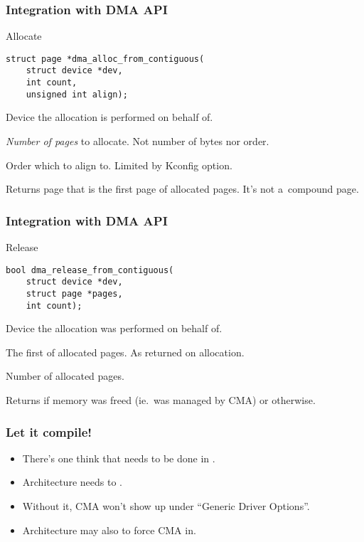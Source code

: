 \begin{frame}[fragile]
  \frametitle{Integration with DMA API}

  \begin{block}{Allocate}
\begin{lstlisting}
struct page *dma_alloc_from_contiguous(
    struct device *dev,
    int count,
    unsigned int align);
\end{lstlisting}
  \end{block}

  \begin{description}[countAA]
  \item[{\ttfamily dev}] Device the allocation is performed on behalf
    of.
  \item[{\ttfamily count}] \emph{Number of pages} to
    allocate. {\footnotesize Not number of bytes nor order.}
  \item[{\ttfamily align}] Order which to align to.  Limited by
    Kconfig option.
  \item Returns page that is the first page of  allocated
    pages. {\footnotesize It's not a~compound page.}
  \end{description}
\end{frame}

\begin{frame}[fragile]
  \frametitle{Integration with DMA API}

  \begin{block}{Release}
\begin{lstlisting}
bool dma_release_from_contiguous(
    struct device *dev,
    struct page *pages,
    int count);
\end{lstlisting}
  \end{block}

  \begin{description}[countAA]
  \item[{\ttfamily dev}] Device the allocation was performed on behalf
    of.
  \item[{\ttfamily pages}] The first of allocated
    pages. {\footnotesize As returned on allocation.}
  \item[{\ttfamily count}] Number of allocated pages.
  \item Returns  if memory was freed (ie.\ was managed by
    CMA) or  otherwise.
  \end{description}
\end{frame}

\begin{frame}
  \frametitle{Let it compile!}

  \begin{itemize}
  \item There's one think that needs to be done in .
  \item Architecture needs to .
  \item Without it, CMA won't show up under “Generic Driver Options”.
  \item Architecture may also  to force CMA in.
  \end{itemize}
\end{frame}
